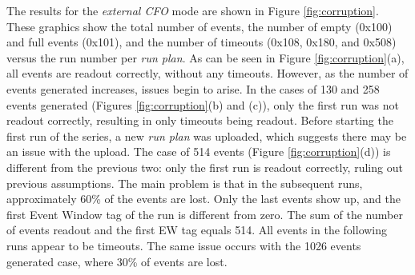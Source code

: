 The results for the \textit{external CFO} mode are shown in Figure \ref{fig:corruption}. 
These graphics show the total number of events, the number of empty (0x100) and full events (0x101), and 
the number of timeouts (0x108, 0x180, and 0x508) versus the run number per \textit{run plan}.
As can be seen in Figure \ref{fig:corruption}(a), all events are readout correctly, without any timeouts.
However, as the number of events generated increases, issues begin to arise.
In the cases of 130 and 258 events generated (Figures \ref{fig:corruption}(b) and (c)), only the first run 
was not readout correctly, resulting in only timeouts being readout.
Before starting the first run of the series, a new \textit{run plan} was uploaded, 
which suggests there may be an issue with the upload.
The case of 514 events (Figure \ref{fig:corruption}(d)) is different from the previous two: 
only the first run is readout correctly, ruling out previous assumptions. The main problem is 
that in the subsequent runs, approximately 60\% of the events are lost. Only the last events 
show up, and the first Event Window tag of the run is different from zero. The sum of the number 
of events readout and the first EW tag equals 514.
All events in the following runs appear to be timeouts. The same issue occurs with the 
1026 events generated case, where 30\% of events are lost.


